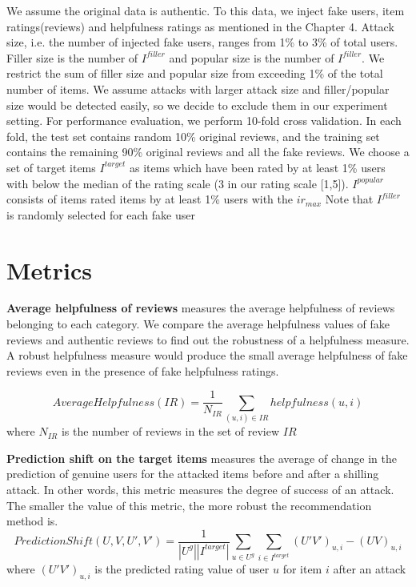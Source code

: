 \documentclass[master,english,final]{kaist-ucs}
\begin{document}
We assume the original data is authentic.
To this data, we inject fake users, item ratings(reviews) and helpfulness ratings as mentioned in the Chapter 4.
Attack size, i.e. the number of injected fake users, ranges from 1\% to 3\% of total users.
Filler size is the number of $I^{filler}$ and popular size is the number of $I^{filler}$.
We restrict the sum of filler size and popular size from exceeding 1\% of the total number of items.
We assume attacks with larger attack size and filler/popular size would be detected easily, so we decide to exclude them in our experiment setting.
For performance evaluation, we perform 10-fold cross validation.
In each fold, the test set contains random 10\% original reviews, and the training set contains the remaining 90\% original reviews and all the fake reviews.
We choose a set of target items $I^{target}$ as items which have been rated by at least 1\% users with below the median of the rating scale (3 in our rating scale [1,5]).
$I^{popular}$ consists of items rated items by at least 1\% users with the $ir_{max}$
Note that $I^{filler}$ is randomly selected for each fake user


\section{Metrics}
\textbf{Average helpfulness of reviews} measures the average helpfulness of reviews belonging to each category.
We compare the average helpfulness values of fake reviews and authentic reviews to find out the robustness of a helpfulness measure.
A robust helpfulness measure would produce the small average helpfulness of fake reviews even in the presence of fake helpfulness ratings.

\begin{equation}
AverageHelpfulness(IR) = \frac{1}{N_{IR}} \sum_{ (u,i) \in IR } helpfulness(u,i)
\end{equation}
where $N_{IR}$ is the number of reviews in the set of review $IR$

\textbf{Prediction shift on the target items} measures the average of change in the prediction of genuine users for the attacked items before and after a shilling attack.
In other words, this metric measures the degree of success of an attack.
The smaller the value of this metric, the more robust the recommendation method is.
\begin{equation}
PredictionShift(U,V,U',V') = \frac{1}{|U^g||I^{target}|} \sum_{u \in U^g} \sum_{i \in I^{target}} (U'V')_{u,i}-(UV)_{u,i}
\end{equation}
where $(U'V')_{u,i}$ is the predicted rating value of user $u$ for item $i$ after an attack
\end{document}
